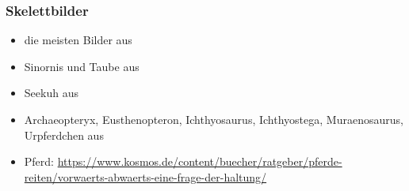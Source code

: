  \subsubsection{Skelettbilder}
 \begin{itemize}
  \item die meisten Bilder aus \cite{Spezielle_Zoologie}
  \item Sinornis und Taube aus \cite{Vergleichende_Anatomie}
  \item Seekuh aus \cite{Zoologie25Wehner}
  \item Archaeopteryx, Eusthenopteron, Ichthyosaurus, Ichthyostega, Muraenosaurus, Urpferdchen aus \cite{Zoologie24Wehner}
  \item Pferd: \url{https://www.kosmos.de/content/buecher/ratgeber/pferde-reiten/vorwaerts-abwaerts-eine-frage-der-haltung/}
 \end{itemize}

 
